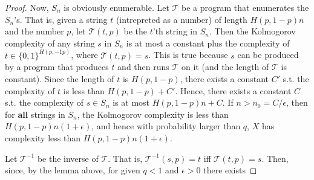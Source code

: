 \documentclass[11pt]{article} \usepackage{amssymb}
\begin{document}
\begin{enumerate}
\begin{proof}
  Now, $S_n$ is obviously enumerable. Let $\mathcal{T}$ be 
  a program that enumerates the $S_n$'s. That is, 
  given a string $t$ (intrepreted as a number) of length $H(p,1-p)n$ and the 
  number $p$, let $\mathcal{T}(t,p)$ be  
  the $t$'th string in $S_n$.
  Then the Kolmogorov complexity of any string
  $s$ in $S_n$ is at most a constant plus the complexity of $t\in \{0,1\}^{H(p,-1p)}$, where 
  $\mathcal{T}(t,p)=s$. This is true because $s$ can be produced by a 
  program that
  produces $t$ and then runs $\mathcal{T}$ on it (and the length of $\mathcal{T}$ is 
  constant).
  Since the length of $t$ is $H(p,1-p)$, there exists a constant $C'$ s.t. 
  the complexity of $t$ is less than $H(p,1-p)+C'$. Hence,
  there exists a constant $C$ s.t.
  the complexity of $s\in S_n$ is at most $H(p,1-p)n+C$. If $n>n_0=C/\epsilon$, 
  then for {\bf all} strings in $S_n$, the Kolmogorov complexity is less than 
  $H(p,1-p)n(1+\epsilon)$, and hence with probability larger than $q$, $X$
  has complexity less than $H(p,1-p)n(1+\epsilon)$.
  
  Let $\mathcal{T}^{-1}$ be the inverse of $\mathcal{T}$. That is,
  $\mathcal{T}^{-1}(s,p)=t$ iff $\mathcal{T}(t,p)=s$. 
  Then, since, by the lemma above, for given $q<1$ and $\epsilon>0$ there
  exists 
  
  \end{proof}
\end{enumerate}
\end{document}
